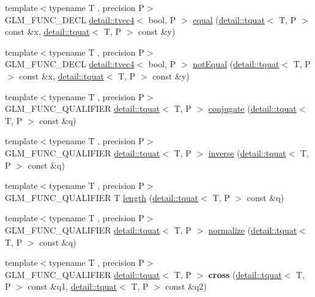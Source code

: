 \begin{DoxyCompactItemize}
\item 
{\footnotesize template$<$typename T , precision P$>$ }\\G\+L\+M\+\_\+\+F\+U\+N\+C\+\_\+\+D\+E\+CL \hyperlink{structglm_1_1detail_1_1tvec4}{detail\+::tvec4}$<$ bool, P $>$ \hyperlink{group__gtc__quaternion_ga32ff2cc6fb576639a6237d8d8ed5818b}{equal} (\hyperlink{structglm_1_1detail_1_1tquat}{detail\+::tquat}$<$ T, P $>$ const \&x, \hyperlink{structglm_1_1detail_1_1tquat}{detail\+::tquat}$<$ T, P $>$ const \&y)
\item 
{\footnotesize template$<$typename T , precision P$>$ }\\G\+L\+M\+\_\+\+F\+U\+N\+C\+\_\+\+D\+E\+CL \hyperlink{structglm_1_1detail_1_1tvec4}{detail\+::tvec4}$<$ bool, P $>$ \hyperlink{group__gtc__quaternion_gaa3a8cf1aa580e435ca96acafbd7870a5}{not\+Equal} (\hyperlink{structglm_1_1detail_1_1tquat}{detail\+::tquat}$<$ T, P $>$ const \&x, \hyperlink{structglm_1_1detail_1_1tquat}{detail\+::tquat}$<$ T, P $>$ const \&y)
\item 
{\footnotesize template$<$typename T , precision P$>$ }\\G\+L\+M\+\_\+\+F\+U\+N\+C\+\_\+\+Q\+U\+A\+L\+I\+F\+I\+ER \hyperlink{structglm_1_1detail_1_1tquat}{detail\+::tquat}$<$ T, P $>$ \hyperlink{group__gtc__quaternion_gaf78006c47276b151777fc194cf11a688}{conjugate} (\hyperlink{structglm_1_1detail_1_1tquat}{detail\+::tquat}$<$ T, P $>$ const \&q)
\item 
{\footnotesize template$<$typename T , precision P$>$ }\\G\+L\+M\+\_\+\+F\+U\+N\+C\+\_\+\+Q\+U\+A\+L\+I\+F\+I\+ER \hyperlink{structglm_1_1detail_1_1tquat}{detail\+::tquat}$<$ T, P $>$ \hyperlink{group__gtc__quaternion_ga6613ef61cb980a18f19ece5f421564da}{inverse} (\hyperlink{structglm_1_1detail_1_1tquat}{detail\+::tquat}$<$ T, P $>$ const \&q)
\item 
{\footnotesize template$<$typename T , precision P$>$ }\\G\+L\+M\+\_\+\+F\+U\+N\+C\+\_\+\+Q\+U\+A\+L\+I\+F\+I\+ER T \hyperlink{group__gtc__quaternion_ga3406ab83e2cafd4034f359957e942410}{length} (\hyperlink{structglm_1_1detail_1_1tquat}{detail\+::tquat}$<$ T, P $>$ const \&q)
\item 
{\footnotesize template$<$typename T , precision P$>$ }\\G\+L\+M\+\_\+\+F\+U\+N\+C\+\_\+\+Q\+U\+A\+L\+I\+F\+I\+ER \hyperlink{structglm_1_1detail_1_1tquat}{detail\+::tquat}$<$ T, P $>$ \hyperlink{group__gtc__quaternion_ga34ee289ca53a08207904e935104715d8}{normalize} (\hyperlink{structglm_1_1detail_1_1tquat}{detail\+::tquat}$<$ T, P $>$ const \&q)
\item 
{\footnotesize template$<$typename T , precision P$>$ }\\G\+L\+M\+\_\+\+F\+U\+N\+C\+\_\+\+Q\+U\+A\+L\+I\+F\+I\+ER \hyperlink{structglm_1_1detail_1_1tquat}{detail\+::tquat}$<$ T, P $>$ {\bfseries cross} (\hyperlink{structglm_1_1detail_1_1tquat}{detail\+::tquat}$<$ T, P $>$ const \&q1, \hyperlink{structglm_1_1detail_1_1tquat}{detail\+::tquat}$<$ T, P $>$ const \&q2)\hypertarget{namespaceglm_ad70062c675bba04acb6b067c448f6b9e}{}\label{namespaceglm_ad70062c675bba04acb6b067c448f6b9e}


\end{DoxyCompactItemize}
